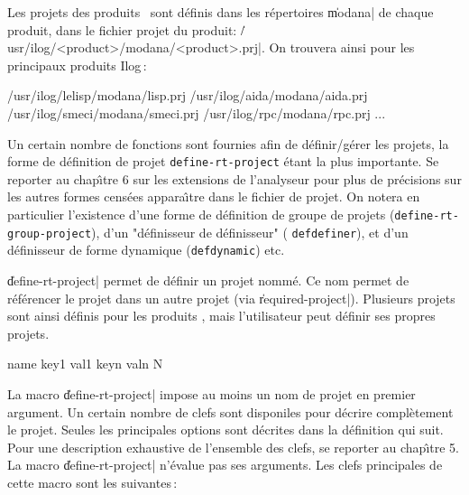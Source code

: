 Les projets des produits \Ilog\
sont d\'{e}finis dans les r\'{e}pertoires \|modana| de chaque produit, dans
le fichier projet du produit: 
\|/usr/ilog/<product>/modana/<product>.prj|. On trouvera ainsi pour
les principaux produits Ilog\,:
\begin{Code*}
/usr/ilog/lelisp/modana/lisp.prj
/usr/ilog/aida/modana/aida.prj
/usr/ilog/smeci/modana/smeci.prj
/usr/ilog/rpc/modana/rpc.prj
 ...
\end{Code*}

Un certain nombre de fonctions sont fournies afin de d\'{e}finir/g\'{e}rer
les projets, la forme de d\'{e}finition de projet {\tt define-rt-project}
\'{e}tant la plus importante. Se reporter au chap\^{\i}tre 6 sur les extensions de
l'analyseur pour plus de pr\'{e}cisions sur les autres formes cens\'{e}es
appara\^{\i}tre dans le fichier de projet. On notera en particulier
l'existence d'une forme de d\'{e}finition de groupe de
projets ({\tt define-rt-group-project}), d'un "d\'{e}finisseur de
d\'{e}finisseur" ( {\tt defdefiner}), et d'un d\'{e}finisseur de 
forme dynamique ({\tt defdynamic}) etc. \\


\|define-rt-project| permet de d\'{e}finir un projet nomm\'{e}.  Ce nom
permet de r\'{e}f\'{e}rencer le projet dans un autre projet (via
\|required-project|). Plusieurs projets
sont ainsi d\'{e}finis pour les produits \Ilog, mais l'utilisateur peut
d\'{e}finir ses propres projets.  

\Macro {define-rt-project} {name key1 val1 keyn valn} {N}

La macro \|define-rt-project| impose au moins un nom de projet en
premier argument. Un certain nombre de clefs sont disponiles pour d\'{e}crire
compl\`{e}tement le projet. Seules les principales options sont d\'{e}crites
dans la d\'{e}finition qui suit. Pour une description exhaustive
de l'ensemble des clefs, se reporter au chap\^{\i}tre 5.
La macro \|define-rt-project| n'\'{e}value pas ses arguments. 
Les clefs principales de cette macro sont les suivantes\,:

